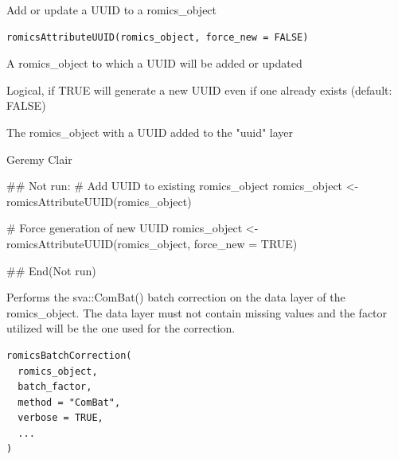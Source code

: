 \documentclass[a4paper]{book}
\begin{document}
%
\begin{Description}
Add or update a UUID to a romics\_object
\end{Description}
%
\begin{Usage}
\begin{verbatim}
romicsAttributeUUID(romics_object, force_new = FALSE)
\end{verbatim}
\end{Usage}
%
\begin{Arguments}
\begin{ldescription}
\item[\code{romics\_object}] A romics\_object to which a UUID will be added or updated

\item[\code{force\_new}] Logical, if TRUE will generate a new UUID even if one already exists (default: FALSE)
\end{ldescription}
\end{Arguments}
%
\begin{Value}
The romics\_object with a UUID added to the "uuid" layer
\end{Value}
%
\begin{Author}
Geremy Clair
\end{Author}
%
\begin{Examples}
\begin{ExampleCode}
## Not run: 
# Add UUID to existing romics_object
romics_object <- romicsAttributeUUID(romics_object)

# Force generation of new UUID
romics_object <- romicsAttributeUUID(romics_object, force_new = TRUE)

## End(Not run)
\end{ExampleCode}
\end{Examples}
%
\begin{Description}
Performs the sva::ComBat() batch correction on the data layer of the romics\_object. The data layer must not contain missing values and the factor utilized will be the one used for the correction.
\end{Description}
%
\begin{Usage}
\begin{verbatim}
romicsBatchCorrection(
  romics_object,
  batch_factor,
  method = "ComBat",
  verbose = TRUE,
  ...
)
\end{verbatim}
\end{Usage}
%
\end{document}
